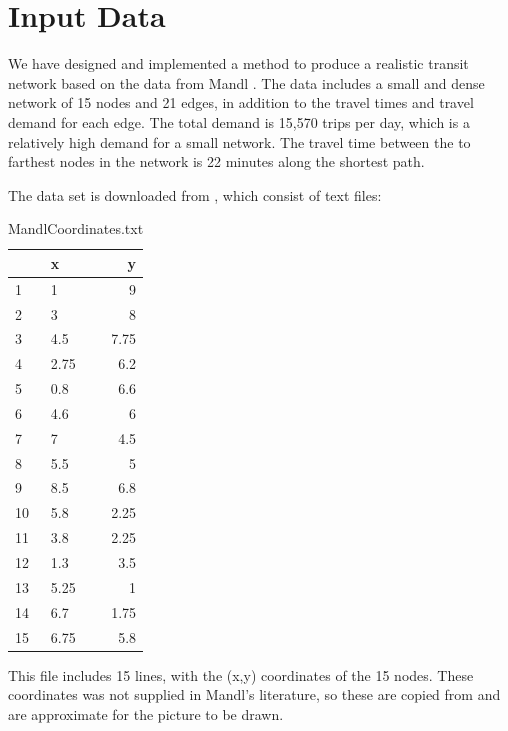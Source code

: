 \section{Input Data}
\label{sec:inputData}

We have designed and implemented a method to produce a realistic transit network based on the data from Mandl \citep{mandl79}. The data includes a small and dense network of 15 nodes and 21 edges, in addition to the travel times and travel demand for each edge. The total demand is 15,570 trips per day, which is a relatively high demand for a small network. The travel time between the to farthest nodes in the network is 22 minutes along the shortest path. 

The data set is downloaded from \citet{mumford13}, which consist of text files:

\begin{table}[H]
    \begin{center}
        \begin{tabular}{|l|lr|}
     	\hline
     	~ & x & y \\
     	\hline
        1 & 1 & 9 \\
        2 & 3 & 8 \\
        3 & 4.5 & 7.75 \\
        4 & 2.75 & 6.2 \\
        5 & 0.8 & 6.6 \\
        6 & 4.6 & 6 \\
        7 & 7 & 4.5 \\
        8 & 5.5 & 5 \\
        9 & 8.5 & 6.8 \\
        10 & 5.8 & 2.25 \\
        11 & 3.8 & 2.25 \\
        12 & 1.3 & 3.5 \\
    	13 & 5.25 & 1 \\
    	14 & 6.7 & 1.75 \\
    	15 & 6.75 & 5.8 \\
    	\hline
        \end{tabular}
    \end{center}
    \caption {MandlCoordinates.txt}
    \label{table:MandlCoords}
    This file includes 15 lines, with the (x,y) coordinates of the 15 nodes. These coordinates was not supplied in Mandl's literature, so these are copied from \citet{mumford13} and are approximate for the picture to be drawn.
\end{table}

